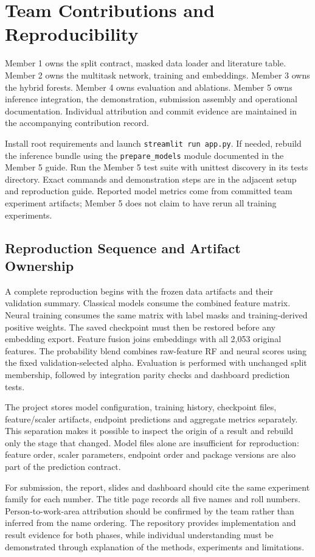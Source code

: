 \documentclass[conference]{IEEEtran}
\begin{document}
\section{Team Contributions and Reproducibility}
Member 1 owns the split contract, masked data loader and literature table. Member 2 owns the multitask network, training and embeddings. Member 3 owns the hybrid forests. Member 4 owns evaluation and ablations. Member 5 owns inference integration, the demonstration, submission assembly and operational documentation. Individual attribution and commit evidence are maintained in the accompanying contribution record.

Install root requirements and launch \texttt{streamlit run app.py}. If needed, rebuild the inference bundle using the \texttt{prepare\_models} module documented in the Member 5 guide. Run the Member 5 test suite with unittest discovery in its tests directory. Exact commands and demonstration steps are in the adjacent setup and reproduction guide. Reported model metrics come from committed team experiment artifacts; Member 5 does not claim to have rerun all training experiments.


\subsection{Reproduction Sequence and Artifact Ownership}
A complete reproduction begins with the frozen data artifacts and their validation summary. Classical models consume the combined feature matrix. Neural training consumes the same matrix with label masks and training-derived positive weights. The saved checkpoint must then be restored before any embedding export. Feature fusion joins embeddings with all 2,053 original features. The probability blend combines raw-feature RF and neural scores using the fixed validation-selected alpha. Evaluation is performed with unchanged split membership, followed by integration parity checks and dashboard prediction tests.

The project stores model configuration, training history, checkpoint files, feature/scaler artifacts, endpoint predictions and aggregate metrics separately. This separation makes it possible to inspect the origin of a result and rebuild only the stage that changed. Model files alone are insufficient for reproduction: feature order, scaler parameters, endpoint order and package versions are also part of the prediction contract.

For submission, the report, slides and dashboard should cite the same experiment family for each number. The title page records all five names and roll numbers. Person-to-work-area attribution should be confirmed by the team rather than inferred from the name ordering. The repository provides implementation and result evidence for both phases, while individual understanding must be demonstrated through explanation of the methods, experiments and limitations.
\end{document}
